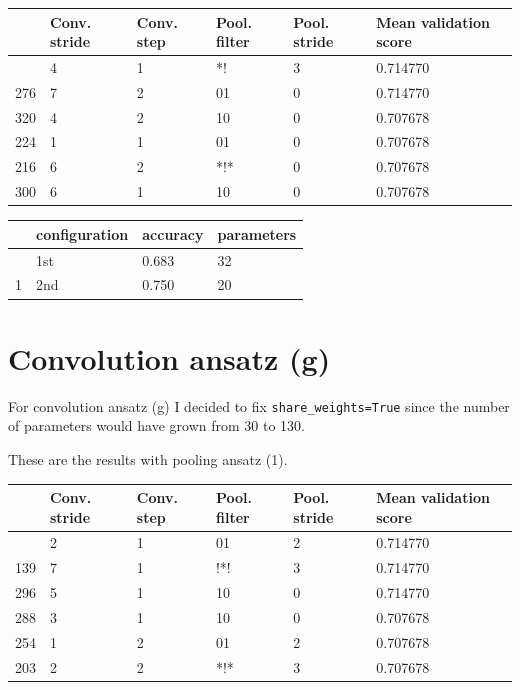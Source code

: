 \documentclass[
  13pt,
  a4paper,
  DIV=11,
  numbers=noendperiod]{scrreprt}
\begin{document}
\begin{longtable}[]{@{}llllll@{}}
\toprule\noalign{}
& Conv. stride & Conv. step & Pool. filter & Pool. stride & Mean
validation score \\
\midrule\noalign{}
\endhead
\bottomrule\noalign{}
\endlastfoot
71 & 4 & 1 & *! & 3 & 0.714770 \\
276 & 7 & 2 & 01 & 0 & 0.714770 \\
320 & 4 & 2 & 10 & 0 & 0.707678 \\
224 & 1 & 1 & 01 & 0 & 0.707678 \\
216 & 6 & 2 & *!* & 0 & 0.707678 \\
300 & 6 & 1 & 10 & 0 & 0.707678 \\
\end{longtable}

\begin{longtable}[]{@{}llll@{}}
\toprule\noalign{}
& configuration & accuracy & parameters \\
\midrule\noalign{}
\endhead
\bottomrule\noalign{}
\endlastfoot
0 & 1st & 0.683 & 32 \\
1 & 2nd & 0.750 & 20 \\
\end{longtable}

\section{Convolution ansatz (g)}\label{convolution-ansatz-g}

For convolution ansatz (g) I decided to fix \texttt{share\_weights=True}
since the number of parameters would have grown from 30 to 130.

These are the results with pooling ansatz (1).

\begin{longtable}[]{@{}llllll@{}}
\toprule\noalign{}
& Conv. stride & Conv. step & Pool. filter & Pool. stride & Mean
validation score \\
\midrule\noalign{}
\endhead
\bottomrule\noalign{}
\endlastfoot
230 & 2 & 1 & 01 & 2 & 0.714770 \\
139 & 7 & 1 & !*! & 3 & 0.714770 \\
296 & 5 & 1 & 10 & 0 & 0.714770 \\
288 & 3 & 1 & 10 & 0 & 0.707678 \\
254 & 1 & 2 & 01 & 2 & 0.707678 \\
203 & 2 & 2 & *!* & 3 & 0.707678 \\
\end{longtable}
\end{document}
